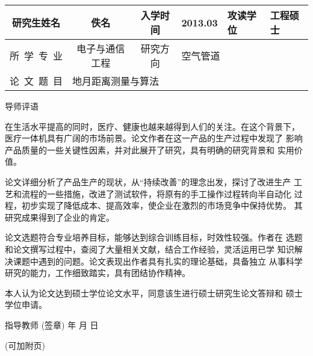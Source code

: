 \documentclass[a4paper,12pt]{article}
\newcommand*{\kaishu}{\CJKfamily{kaiti}}     %
\newcommand*{\heiti}{\CJKfamily{heiti}}     %
\begin{document}
\pagestyle{empty}
\fontsize{12}{16}\selectfont
\begin{center}
\begin{tabularx}{\textwidth}{c|c|c|c|c|X|X}
研究生姓名 & \multicolumn{2}{c|}{佚名} & 入学时间 & 2013.03 & 攻读学位
        & 工程硕士\\\hline
所~学~专~业   & \multicolumn{2}{c|}{电子与通信工程}
        & 研究方向 & \multicolumn{3}{l}{空气管道}\\\hline
论~文~题~目 & \multicolumn{6}{l}{地月距离测量与算法}\\\hline
\end{tabularx}

\fontsize{12}{14}\selectfont
\vskip 8mm
\Large \kaishu 导师评语\end{center}

\fontsize{12}{12}\selectfont

在生活水平提高的同时，医疗、健康也越来越得到人们的关注。在这个背景下，
医疗一体机具有广阔的市场前景。论文作者在这一产品的生产过程中发现了
影响产品质量的一些关键性因素，并对此展开了研究，具有明确的研究背景和
实用价值。

论文详细分析了产品生产的现状，从``持续改善''的理念出发，探讨了改进生产
工艺和流程的一些措施，改进了测试软件，将原有的手工操作过程转向半自动化
过程，初步实现了降低成本、提高效率，使企业在激烈的市场竞争中保持优势。
其研究成果得到了企业的肯定。
    
论文选题符合专业培养目标，能够达到综合训练目标，时效性较强。作者在
选题和论文撰写过程中，查阅了大量相关文献，结合工作经验，灵活运用已学
知识解决课题中遇到的问题。论文表现出作者具有扎实的理论基础，具备独立
从事科学研究的能力，工作细致踏实，具有团结协作精神。

本人认为论文达到硕士学位论文水平，同意该生进行硕士研究生论文答辩和
硕士学位申请。

\vfill
\hfill {\heiti 指导教师}\underline{\hskip 35mm} (签章)\qquad\qquad
\vskip 1cm
\hfill 年\hskip 12mm 月\hskip 12mm 日\qquad\qquad

\noindent(可加附页)
\end{document}

